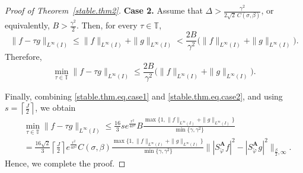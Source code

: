 \documentclass[11pt, reqno]{amsart}
\numberwithin{equation}{section}
\begin{document}
\begin{proof}[Proof of Theorem~\ref{stable.thm2}]
\smallskip
\noindent
\textbf{Case 2.} Assume that $
\Delta>\frac{\gamma^2}{2\sqrt{2}\,C(\sigma,\beta)}$,
or equivalently, $
B>\frac{\gamma^2}{2}$. 
Then, for every $\tau\in\mathbb T$,
$$ \|f-\tau g\|_{L^\infty(I)} \le \|f\|_{L^\infty(I)}+\|g\|_{L^\infty(I)}
< \frac{2B}{\gamma^2} \bigl(\|f\|_{L^\infty(I)}+\|g\|_{L^\infty(I)}\bigr).$$
Therefore,
\begin{equation}\label{stable.thm.eq.case2}
\min_{\tau\in\mathbb T}\|f-\tau g\|_{L^\infty(I)} \le \frac{2B}{\gamma^2} \bigl(\|f\|_{L^\infty(I)}+\|g\|_{L^\infty(I)}\bigr).
\end{equation}

Finally, combining \eqref{stable.thm.eq.case1} and \eqref{stable.thm.eq.case2}, and using 
$ s=\left\lceil \frac{J}{2}\right\rceil$, 
we obtain
\begin{align*}
&\min_{\tau\in\mathbb T}\|f-\tau g\|_{L^\infty(I)} \le \frac{16}{3}se^{\frac{r^2}{4\sigma^2}}
B\frac{\max\{1,\|f\|_{L^\infty(I)}+\|g\|_{L^\infty(I)}\}}{\min\{\gamma,\gamma^2\}} \\
&=\frac{16\sqrt{2}}{3}\left\lceil \frac{J}{2}\right\rceil e^{\frac{r^2}{4\sigma^2}} C(\sigma,\beta)
\frac{\max\{1,\|f\|_{L^\infty(I)}+\|g\|_{L^\infty(I)}\}}{\min\{\gamma,\gamma^2\}}\bigl\| |S_{\check{\varphi}}^{\mathbf A}f|^2 - |S_{\check{\varphi}}^{\mathbf A}g|^2\bigr\|_{\frac{\beta}{2},\infty}.
\end{align*}
Hence, we complete the proof.
\end{proof}
\end{document}
